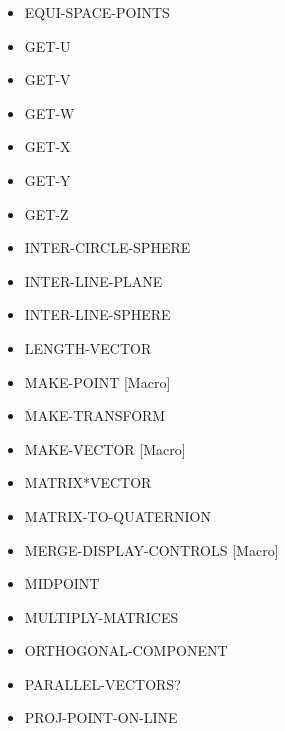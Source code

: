 \documentclass [11pt]{book}
\begin{document}
\begin{itemize}
\item {}EQUI-SPACE-POINTS

\item {}GET-U

\item {}GET-V

\item {}GET-W

\item {}GET-X

\item {}GET-Y

\item {}GET-Z

\item {}INTER-CIRCLE-SPHERE

\item {}INTER-LINE-PLANE

\item {}INTER-LINE-SPHERE

\item {}LENGTH-VECTOR

\item {}MAKE-POINT [Macro]

\item {}MAKE-TRANSFORM

\item {}MAKE-VECTOR [Macro]

\item {}MATRIX*VECTOR

\item {}MATRIX-TO-QUATERNION

\item {}MERGE-DISPLAY-CONTROLS [Macro]

\item {}MIDPOINT

\item {}MULTIPLY-MATRICES

\item {}ORTHOGONAL-COMPONENT

\item {}PARALLEL-VECTORS?

\item {}PROJ-POINT-ON-LINE


\end{itemize}
\end{document}
